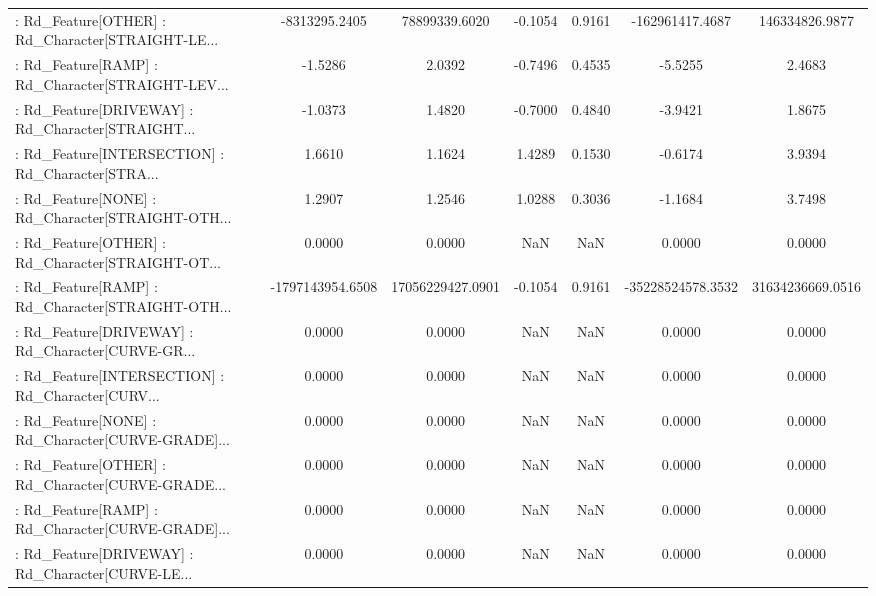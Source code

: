 \begin{longtable}{p{4cm}cccccc}
 : Rd\_Feature[OTHER] : Rd\_Character[STRAIGHT-LE... &     -8313295.2405 &     78899339.6020 & -0.1054 &       0.9161 &    -162961417.4687 &    146334826.9877 \\
 : Rd\_Feature[RAMP] : Rd\_Character[STRAIGHT-LEV... &           -1.5286 &            2.0392 & -0.7496 &       0.4535 &            -5.5255 &            2.4683 \\
 : Rd\_Feature[DRIVEWAY] : Rd\_Character[STRAIGHT... &           -1.0373 &            1.4820 & -0.7000 &       0.4840 &            -3.9421 &            1.8675 \\
 : Rd\_Feature[INTERSECTION] : Rd\_Character[STRA... &            1.6610 &            1.1624 &  1.4289 &       0.1530 &            -0.6174 &            3.9394 \\
 : Rd\_Feature[NONE] : Rd\_Character[STRAIGHT-OTH... &            1.2907 &            1.2546 &  1.0288 &       0.3036 &            -1.1684 &            3.7498 \\
 : Rd\_Feature[OTHER] : Rd\_Character[STRAIGHT-OT... &            0.0000 &            0.0000 &     NaN &          NaN &             0.0000 &            0.0000 \\
 : Rd\_Feature[RAMP] : Rd\_Character[STRAIGHT-OTH... &  -1797143954.6508 &  17056229427.0901 & -0.1054 &       0.9161 &  -35228524578.3532 &  31634236669.0516 \\
 : Rd\_Feature[DRIVEWAY] : Rd\_Character[CURVE-GR... &            0.0000 &            0.0000 &     NaN &          NaN &             0.0000 &            0.0000 \\
 : Rd\_Feature[INTERSECTION] : Rd\_Character[CURV... &            0.0000 &            0.0000 &     NaN &          NaN &             0.0000 &            0.0000 \\
 : Rd\_Feature[NONE] : Rd\_Character[CURVE-GRADE]... &            0.0000 &            0.0000 &     NaN &          NaN &             0.0000 &            0.0000 \\
 : Rd\_Feature[OTHER] : Rd\_Character[CURVE-GRADE... &            0.0000 &            0.0000 &     NaN &          NaN &             0.0000 &            0.0000 \\
 : Rd\_Feature[RAMP] : Rd\_Character[CURVE-GRADE]... &            0.0000 &            0.0000 &     NaN &          NaN &             0.0000 &            0.0000 \\
 : Rd\_Feature[DRIVEWAY] : Rd\_Character[CURVE-LE... &            0.0000 &            0.0000 &     NaN &          NaN &             0.0000 &            0.0000 \\

\end{longtable}
